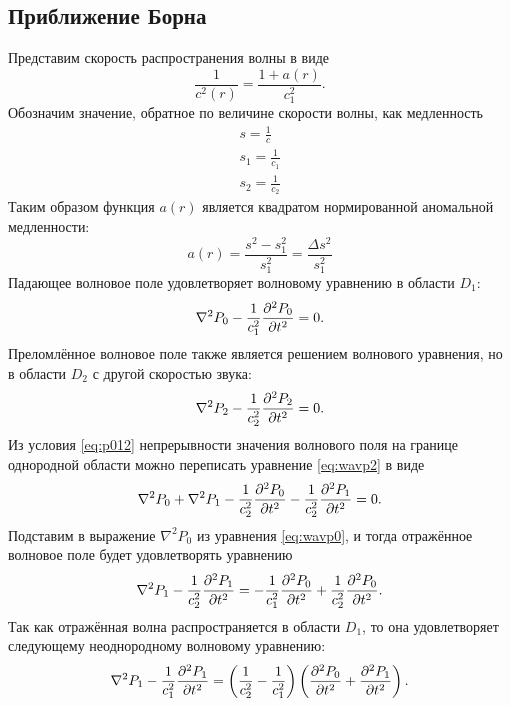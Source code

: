 \documentclass[a4paper, fontsize=14pt]{article}
\begin{document}
	\subsection{Приближение Борна}
	Представим скорость распространения волны в виде
	\begin{equation}
		\frac{1}{c^2(r)} = \frac{1+a(r)}{c_1^2}.
	\end{equation}
	Обозначим значение, обратное по величине скорости волны, как медленность 
	\begin{gather*}
		s = \frac{1}{c} \\
		s_1 = \frac{1}{c_1} \\
		s_2 = \frac{1}{c_2}
	\end{gather*}
	Таким образом функция $a(r)$ является квадратом нормированной аномальной медленности:
	$$
		a(r) = \frac{s^2 - s_1^2}{s_1^2} = \frac{\Delta s^2}{s_1^2}
	$$
	Падающее волновое поле удовлетворяет волновому уравнению в области $D_1$:
	\begin{equation}
		\nabla^2 P_0 - \frac{1}{c_1^2}\diff[2]{P_0}{t} = 0.
		\label{eq:wavp0}
	\end{equation}
	Преломлённое волновое поле также является решением волнового уравнения, но в области $D_2$ с другой скоростью звука:
	\begin{equation}
		\nabla^2 P_2 - \frac{1}{c_2^2}\diff[2]{P_2}{t} = 0.
		\label{eq:wavp2}
	\end{equation}
	Из условия \ref{eq:p012} непрерывности значения  волнового поля на границе однородной области можно переписать уравнение \ref{eq:wavp2} в виде
	\begin{equation}
		\nabla^2 P_0 + \nabla^2 P_1 - \frac{1}{c_2^2}\diff[2]{P_0}{t} - \frac{1}{c_2^2}\diff[2]{P_1}{t}  = 0.
		\label{eq:wavp01sum}
	\end{equation}
	Подставим в выражение $\nabla^2 P_0$ из уравнения \ref{eq:wavp0}, и
	тогда отражённое волновое поле будет удовлетворять уравнению \cite{bleistein2012mathematical}
	\begin{equation}
		 \nabla^2 P_1 - \frac{1}{c_2^2}\diff[2]{P_1}{t}  = - \frac{1}{c_1^2}\diff[2]{P_0}{t} + \frac{1}{c_2^2}\diff[2]{P_0}{t}.
	\end{equation}
	Так как отражённая волна распространяется в области $D_1$, то она удовлетворяет следующему неоднородному волновому уравнению:
	\begin{equation}
		\nabla^2 P_1 - \frac{1}{c_1^2}\diff[2]{P_1}{t}  = \left(\frac{1}{c_2^2} - \frac{1}{c_1^2}\right)\left(\diff[2]{P_0}{t} + \diff[2]{P_1}{t}\right).
		\label{eq:wavp1inh}
	\end{equation}
\end{document}
